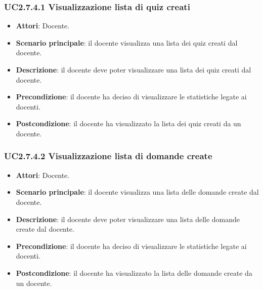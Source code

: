 \subsubsection{UC2.7.4.1 Visualizzazione lista di quiz creati}
\begin{itemize}
\item \textbf{Attori}: Docente.
\item \textbf{Scenario principale}: il docente visualizza una lista dei quiz creati dal docente.
\item \textbf{Descrizione}: il docente deve poter visualizzare una lista dei quiz creati dal docente.
\item \textbf{Precondizione}: il docente ha deciso di visualizzare le statistiche legate ai docenti.
\item \textbf{Postcondizione}: il docente ha visualizzato la lista dei quiz creati da un docente.
\end{itemize}
\subsubsection{UC2.7.4.2 Visualizzazione lista di domande create}
\begin{itemize}
\item \textbf{Attori}: Docente.
\item \textbf{Scenario principale}: il docente visualizza una lista delle domande create dal docente.
\item \textbf{Descrizione}: il docente deve poter visualizzare una lista delle domande create dal docente.
\item \textbf{Precondizione}: il docente ha deciso di visualizzare le statistiche legate ai docenti.
\item \textbf{Postcondizione}: il docente ha visualizzato la lista delle domande create da un docente.
\end{itemize}
